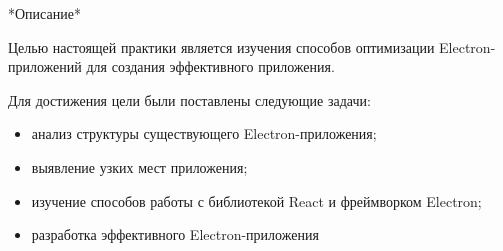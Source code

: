 \intro

*Описание*

Целью настоящей практики является изучения способов оптимизации Electron-приложений для создания эффективного приложения.

Для достижения цели были поставлены следующие задачи:

\begin{itemize}
  \item анализ структуры существующего Electron-приложения;
  \item выявление узких мест приложения;
  \item изучение способов работы с библиотекой React и фреймворком Electron;
  \item разработка эффективного Electron-приложения
\end{itemize}